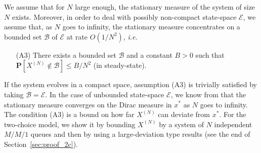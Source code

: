 \documentclass[sigconf]{acmart}
\newcommand\XN{X^{(N)}}
\newcommand\E{\mathcal{E}}
\newcommand\calB{\mathcal{B}}
\newcommand\sProba[1]{\mathbf{P}[#1]}
\begin{document}
We assume that for $N$ large enough, the stationary measure of the
system of size $N$ exists. Moreover, in order to deal with possibly
non-compact state-space $\E$, we assume that, as $N$ goes to infinity,
the stationary measure concentrates on a bounded set $\calB$ of $\E$
at rate $O(1/N^2)$, \emph{i.e.}
\begin{itemize}
\item[(A3)] There exists a bounded set $\calB$ and a constant $B>0$
  such that $\sProba{\XN\not\in\calB}\le B/N^2$ (in steady-state). 
\end{itemize}
If the system evolves in a compact space, assumption (A3) is trivially
satisfied by taking $\calB=\E$. In the case of unbounded state-space
$\E$, we know from \cite{benaim2008class} that the stationary measure
converges on the Dirac measure in $x^*$ as $N$ goes to infinity. The
condition (A3) is a bound on how far $\XN$ can deviate from $x^*$.
For the two-choice model, we show it by bounding $\XN$ by a system of
$N$ independent $M/M/1$ queues and then by using a large-deviation
type results (see the end of Section~\ref{sec:proof_2c}).
\end{document}
